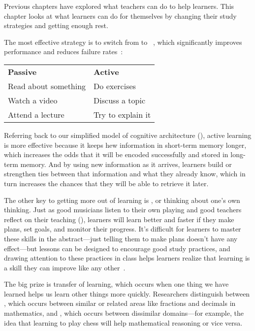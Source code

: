 
Previous chapters have explored what teachers can do to help learners.
This chapter looks at what learners can do for themselves
by changing their study strategies and getting enough rest.

The most effective strategy is to switch from 
to ~\cite{Hpl2018},
which significantly improves performance and reduces failure rates~\cite{Free2014}:

\begin{longtable}{ll}
\textbf{Passive}		& \textbf{Active} \\
Read about something		& Do exercises \\
Watch a video			& Discuss a topic \\
Attend a lecture		& Try to explain it
\end{longtable}

\noindent
Referring back to our simplified model of cognitive architecture (),
active learning is more effective because it keeps hew information in short-term memory longer,
which increases the odds that it will be encoded successfully and stored in long-term memory.
And by using new information as it arrives,
learners build or strengthen ties between that information and what they already know,
which in turn increases the chances that they will be able to retrieve it later.

The other key to getting more out of learning is ,
or thinking about one's own thinking.
Just as good musicians listen to their own playing
and good teachers reflect on their teaching (),
learners will learn better and faster if they make plans,
set goals,
and monitor their progress.
It's difficult for learners to master these skills in the abstract---just telling them
to make plans doesn't have any effect---but
lessons can be designed to encourage good study practices,
and drawing attention to these practices in class
helps learners realize that learning is a skill they can improve like any other~\cite{McGu2015,Miya2018}.

The big prize is transfer of learning,
which occurs when one thing we have learned helps us learn other things more quickly.
Researchers distinguish between ,
which occurs between similar or related areas like fractions and decimals in mathematics,
and ,
which occurs between dissimilar domains---for example,
the idea that learning to play chess will help mathematical reasoning or vice versa.

